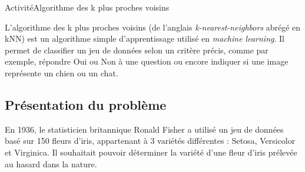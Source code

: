 \documentclass[11pt,a4paper]{article}
\begin{document}
\begin{NSI}
{Activité}{Algorithme des k plus proches voisins}
\end{NSI}

L'algorithme des k plus proches voisins (de l'anglais \textit{k-nearest-neighbors} abrégé en kNN) est un algorithme simple d'apprentissage utilisé en \textit{machine learning}. Il permet de classifier un jeu de données selon un critère précis, comme par exemple, répondre Oui ou Non à une question ou encore indiquer si une image représente un chien ou un chat.


\subsection*{Présentation du problème}

En 1936, le statisticien britannique Ronald Fisher a utilisé un jeu de données basé sur 150 fleurs d'iris, appartenant à 3 variétés différentes : Setosa, Versicolor et Virginica. Il souhaitait pouvoir déterminer la variété d'une fleur d'iris prélevée au hasard dans la nature.
\end{document}
